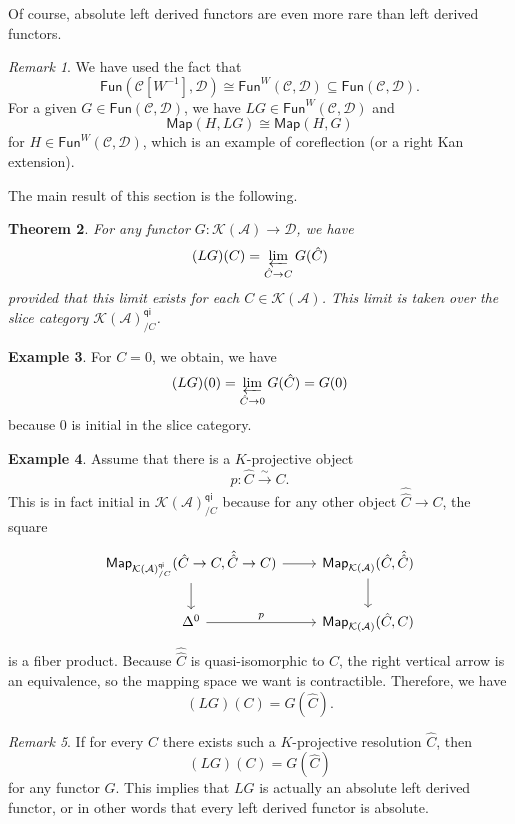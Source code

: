 \documentclass[10pt, oneside]{memoir}
\newtheorem{thm}{Theorem}[subsection]
\theoremstyle{definition}
\newtheorem{exm}[thm]{Example}
\theoremstyle{remark}
\newtheorem{rmk}[thm]{Remark}
\theoremstyle{plain}
\theoremstyle{definition}
\theoremstyle{remark}
\newcommand{\mc}[1]{\mathcal{#1}}
\newcommand{\ms}[1]{\mathsf{#1}}
\newcommand{\1}{\mathbf{1}}
\newcommand{\2}{\mathbf{2}}
\newcommand{\3}{\mathbf{3}}
\begin{document}
Of course, absolute left derived functors are even more rare than left derived functors.

\begin{rmk}
    We have used the fact that
    \[ \ms{Fun}(\mc{C}[W^{-1}], \mc{D}) \cong \ms{Fun}^W(\mc{C}, \mc{D}) \subseteq \ms{Fun}(\mc{C}, \mc{D}). \]
    For a given $G \in \ms{Fun}(\mc{C}, \mc{D})$, we have $LG \in \ms{Fun}^W(\mc{C}, \mc{D})$ and
    \[ \ms{Map}(H, LG) \cong \ms{Map}(H, G) \]
    for $H \in \ms{Fun}^W(\mc{C}, \mc{D})$, which is an example of coreflection (or a right Kan extension).
\end{rmk}

The main result of this section is the following.
\begin{thm}\label{thm:formulaleftderived}
    For any functor $G \colon \mc{K}(\mc{A}) \to \mc{D}$, we have
    \[ (LG)(C) = \varprojlim_{\hat{C} \to C} G(\hat{C}) \]
    provided that this limit exists for each $C \in \mc{K}(\mc{A})$. This limit is taken over the slice category $\mc{K}(\mc{A})_{/C}^{\ms{qi}}$.
\end{thm}

\begin{exm}
    For $C = 0$, we obtain, we have
    \[ (LG)(0) = \varprojlim_{\hat{C} \to 0} G(\hat{C}) = G(0) \]
    because $0$ is initial in the slice category.
\end{exm}

\begin{exm}
    Assume that there is a $K$-projective object 
    \[ p \colon \hat{C} \xrightarrow{\sim} C. \]
    This is in fact initial in $\mc{K}(\mc{A})_{/C}^{\ms{qi}}$ because for any other object $\hat{\hat{C}} \to C$, the square
    \begin{equation*}
    \begin{tikzcd}
        \ms{Map}_{\mc{K}(\mc{A})_{/C}^{\ms{qi}}}(\hat{C} \to C, \hat{\hat{C}} \to C) \ar{r} \ar{d} & \ms{Map}_{\mc{K}(\mc{A})} (\hat{C}, \hat{\hat{C}}) \ar{d} \\
        \Delta^0 \ar{r}{p} & \ms{Map}_{\mc{K}(\mc{A})}(\hat{C}, C)
    \end{tikzcd}
    \end{equation*}
    is a fiber product. Because $\hat{\hat{C}}$ is quasi-isomorphic to $C$, the right vertical arrow is an equivalence, so the mapping space we want is contractible. Therefore, we have
    \[ (LG)(C) = G(\hat{C}). \]
\end{exm}

\begin{rmk}
    If for every $C$ there exists such a $K$-projective resolution $\hat{C}$, then
    \[ (LG)(C) = G(\hat{C}) \]
    for any functor $G$. This implies that $LG$ is actually an absolute left derived functor, or in other words that every left derived functor is absolute.
\end{rmk}
\end{document}
